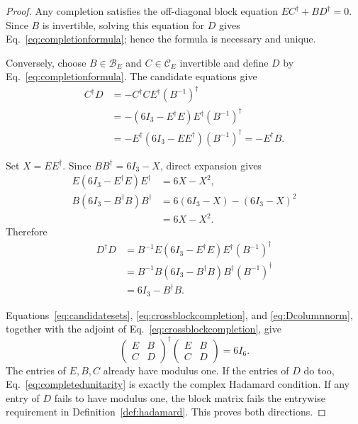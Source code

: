 \begin{proof}
Any completion satisfies the off-diagonal block equation $EC^{\dagger}+BD^{\dagger}=0$.  Since $B$ is invertible, solving this equation for $D$ gives Eq.~\eqref{eq:completionformula}; hence the formula is necessary and unique.

Conversely, choose $B\in\mathcal B_E$ and $C\in\mathcal C_E$ invertible and define $D$ by Eq.~\eqref{eq:completionformula}.  The candidate equations give
\begin{equation}
\begin{aligned}
C^{\dagger}D
&=-C^{\dagger}CE^{\dagger}(B^{-1})^{\dagger}\\
&=-(6I_3-E^{\dagger}E)E^{\dagger}(B^{-1})^{\dagger}\\
&=-E^{\dagger}(6I_3-EE^{\dagger})(B^{-1})^{\dagger}
=-E^{\dagger}B.
\end{aligned}
\label{eq:crossblockcompletion}
\end{equation}

Set $X=EE^{\dagger}$.  Since $BB^{\dagger}=6I_3-X$, direct expansion gives
\begin{equation}
\begin{aligned}
E(6I_3-E^{\dagger}E)E^{\dagger}
&=6X-X^2,\\
B(6I_3-B^{\dagger}B)B^{\dagger}
&=6(6I_3-X)-(6I_3-X)^2\\
&=6X-X^2.
\end{aligned}
\label{eq:completionidentity}
\end{equation}
Therefore
\begin{equation}
\begin{aligned}
D^{\dagger}D
&=B^{-1}E(6I_3-E^{\dagger}E)E^{\dagger}(B^{-1})^{\dagger}\\
&=B^{-1}B(6I_3-B^{\dagger}B)B^{\dagger}(B^{-1})^{\dagger}\\
&=6I_3-B^{\dagger}B.
\end{aligned}
\label{eq:Dcolumnnorm}
\end{equation}

Equations~\eqref{eq:candidatesets}, \eqref{eq:crossblockcompletion}, and \eqref{eq:Dcolumnnorm}, together with the adjoint of Eq.~\eqref{eq:crossblockcompletion}, give
\begin{equation}
\begin{pmatrix}E&B\\C&D\end{pmatrix}^{\!\dagger}
\begin{pmatrix}E&B\\C&D\end{pmatrix}=6I_6.
\label{eq:completedunitarity}
\end{equation}
The entries of $E,B,C$ already have modulus one.  If the entries of $D$ do too, Eq.~\eqref{eq:completedunitarity} is exactly the complex Hadamard condition.  If any entry of $D$ fails to have modulus one, the block matrix fails the entrywise requirement in Definition~\ref{def:hadamard}.  This proves both directions.

\end{proof}

